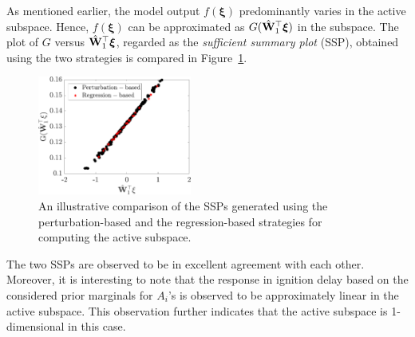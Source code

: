 As mentioned earlier, the model output $f(\bm{\xi})$ predominantly varies in the active subspace. Hence, 
$f(\bm{\xi})$ can be approximated as $G(\hat{\mathbf{{W}}}_1^\top\bm{\xi})$ in
the subspace. The plot of $G$ versus $\hat{\mathbf{{W}}}_1^\top\bm{\xi}$, 
regarded as the \textit{sufficient summary plot} (SSP), obtained using the two strategies is 
compared in Figure~\ref{fig:comp_ssp}.
%
\begin{figure}[htbp]
 \begin{center}
  \includegraphics[width=0.45\textwidth]{./Figures/comp_ssp}
\caption{An illustrative comparison of the SSPs generated using the 
perturbation-based and the regression-based strategies for computing the active subspace.}
\label{fig:comp_ssp}
\end{center}
\end{figure}
%
The two SSPs are observed to be in excellent agreement with each other. Moreover, it is interesting to note
that the response in ignition
delay based on the considered prior marginals for $A_i$'s is observed to be approximately linear in the
active subspace. This observation further indicates that the active subspace is 1-dimensional in this case.

